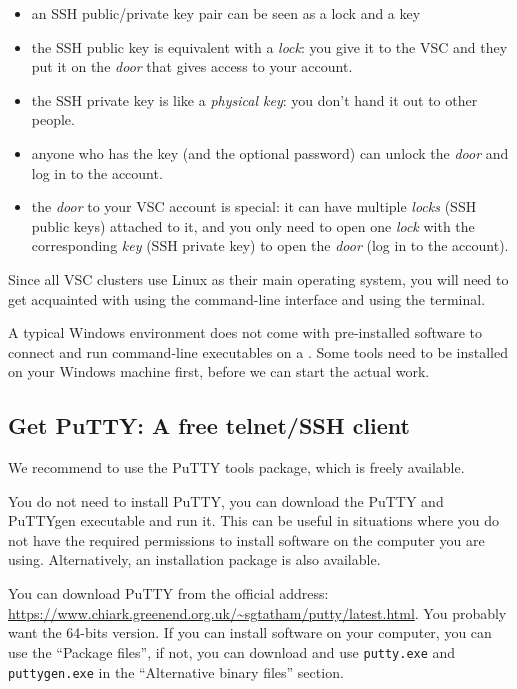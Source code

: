 \begin{itemize}
    \item an SSH public/private key pair can be seen as a lock and a key
    \item the SSH public key is equivalent with a \emph{lock}: you give it to
        the VSC and they put it on the \emph{door} that gives access to your account.
    \item the SSH private key is like a \emph{physical key}: you don't hand it out
        to other people.
    \item anyone who has the key (and the optional password) can unlock the \emph{door}
        and log in to the account.
    \item the \emph{door} to your VSC account is special: it can have multiple \emph{locks}
        (SSH public keys) attached to it, and you only need to open one \emph{lock}
        with the corresponding \emph{key} (SSH private key) to open the \emph{door}
        (log in to the account).
\end{itemize}

Since all VSC clusters use Linux as their main operating system, you will
need to get acquainted with using the command-line interface and using the
terminal.

\ifwindows
  A typical Windows environment does not come with pre-installed
  software to connect and run command-line executables on a \hpc. Some tools
  need to be installed on your Windows machine first, before we can start the
  actual work.

  \subsection{Get PuTTY: A free telnet/SSH client}
  \label{sec:install-putty}

  We recommend to use the PuTTY tools package, which is freely available.

  You do not need to install PuTTY, you can download the PuTTY and PuTTYgen executable
  and run it. This can be useful in situations where you do not have the
  required permissions to install software on the computer you are using.
  Alternatively, an installation package is also available.

  You can download PuTTY from the official address:
  \url{https://www.chiark.greenend.org.uk/~sgtatham/putty/latest.html}. You
  probably want the 64-bits version. If you can install software on your computer,
  you can use the ``Package files'', if not, you can download and use \lstinline|putty.exe|
  and \lstinline|puttygen.exe| in the ``Alternative binary files'' section.

